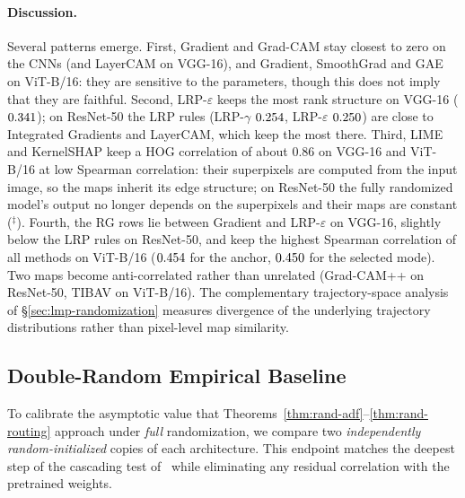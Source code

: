 \documentclass[twoside]{article}
\newcommand{\1}{\mathbf{1}}
\begin{document}
\paragraph{Discussion.}
Several patterns emerge. First, Gradient and Grad-CAM stay closest to zero on the \acp{CNN} (and
LayerCAM on VGG-16), and Gradient, SmoothGrad and \ac{GAE} on ViT-B/16: they are sensitive to the
parameters, though this does not imply that they are faithful. Second, LRP-$\varepsilon$ keeps the
most rank structure on VGG-16 ($0.341$); on ResNet-50 the \ac{LRP} rules
(LRP-$\gamma$ $0.254$, LRP-$\varepsilon$ $0.250$) are close to
Integrated Gradients and LayerCAM, which keep the most there. Third, LIME and KernelSHAP keep a HOG
correlation of about $0.86$ on VGG-16 and ViT-B/16 at low Spearman correlation: their superpixels
are computed from the input image, so the maps inherit its edge structure; on ResNet-50 the fully
randomized model's output no longer depends on the superpixels and their maps are constant
($^{\ddagger}$). Fourth, the \ac{RG} rows lie between Gradient and LRP-$\varepsilon$ on VGG-16,
slightly below the \ac{LRP} rules on ResNet-50, and keep the highest Spearman correlation of all
methods on ViT-B/16 ($0.454$ for the anchor, $0.450$ for the selected
mode). Two maps become anti-correlated rather than unrelated (Grad-CAM++ on ResNet-50, \ac{TIBAV}
on ViT-B/16). The complementary trajectory-space analysis of \S\ref{sec:lmp-randomization} measures
divergence of the underlying trajectory distributions rather than pixel-level map similarity.



\subsection{Double-Random Empirical Baseline}\label{sec:lmp-rand-double-random}

To calibrate the asymptotic value that Theorems~\ref{thm:rand-adf}--\ref{thm:rand-routing} approach
under \emph{full} randomization, we compare two \emph{independently random-initialized} copies of
each architecture.  This endpoint matches the deepest step of the cascading test
of~\citet{Adebayo2018sanity} while eliminating any residual correlation with the pretrained
weights.
\end{document}
